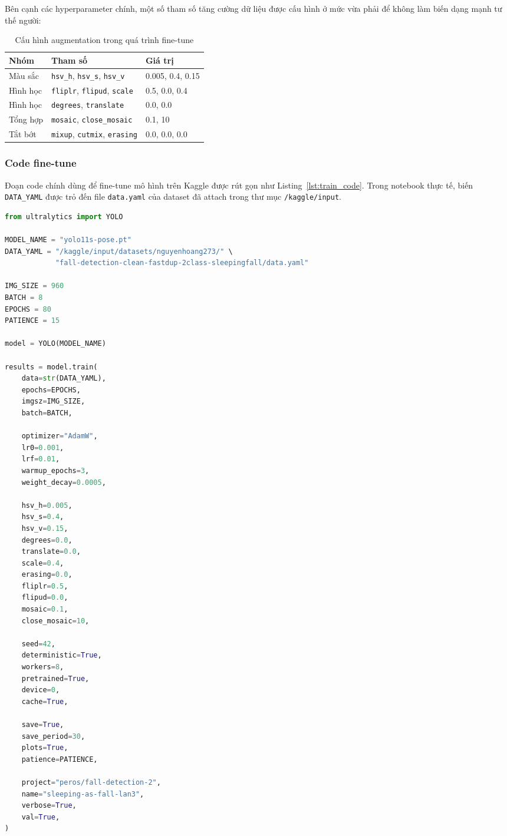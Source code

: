 \documentclass[12pt, a4paper]{article}
\begin{document}
Bên cạnh các hyperparameter chính, một số tham số tăng cường dữ liệu được cấu hình ở mức vừa phải để không làm biến dạng mạnh tư thế người:

\begin{table}[H]
  \centering
  \caption{Cấu hình augmentation trong quá trình fine-tune}
  \label{tab:augmentation_params}
  \begin{tabular}{@{}lll@{}}
    \toprule
    \textbf{Nhóm} & \textbf{Tham số} & \textbf{Giá trị} \\
    \midrule
    Màu sắc & \texttt{hsv\_h}, \texttt{hsv\_s}, \texttt{hsv\_v} & 0.005, 0.4, 0.15 \\
    Hình học & \texttt{fliplr}, \texttt{flipud}, \texttt{scale} & 0.5, 0.0, 0.4 \\
    Hình học & \texttt{degrees}, \texttt{translate} & 0.0, 0.0 \\
    Tổng hợp & \texttt{mosaic}, \texttt{close\_mosaic} & 0.1, 10 \\
    Tắt bớt & \texttt{mixup}, \texttt{cutmix}, \texttt{erasing} & 0.0, 0.0, 0.0 \\
    \bottomrule
  \end{tabular}
\end{table}

\subsubsection{Code fine-tune}
Đoạn code chính dùng để fine-tune mô hình trên Kaggle được rút gọn như Listing~\ref{lst:train_code}.
Trong notebook thực tế, biến \texttt{DATA\_YAML} được trỏ đến file \texttt{data.yaml} của dataset đã attach trong thư mục \texttt{/kaggle/input}.

\begin{lstlisting}[language=Python, caption={Script fine-tune YOLO11s-Pose trên Kaggle}, label={lst:train_code}]
from ultralytics import YOLO

MODEL_NAME = "yolo11s-pose.pt"
DATA_YAML = "/kaggle/input/datasets/nguyenhoang273/" \
            "fall-detection-clean-fastdup-2class-sleepingfall/data.yaml"

IMG_SIZE = 960
BATCH = 8
EPOCHS = 80
PATIENCE = 15

model = YOLO(MODEL_NAME)

results = model.train(
    data=str(DATA_YAML),
    epochs=EPOCHS,
    imgsz=IMG_SIZE,
    batch=BATCH,

    optimizer="AdamW",
    lr0=0.001,
    lrf=0.01,
    warmup_epochs=3,
    weight_decay=0.0005,

    hsv_h=0.005,
    hsv_s=0.4,
    hsv_v=0.15,
    degrees=0.0,
    translate=0.0,
    scale=0.4,
    erasing=0.0,
    fliplr=0.5,
    flipud=0.0,
    mosaic=0.1,
    close_mosaic=10,

    seed=42,
    deterministic=True,
    workers=8,
    pretrained=True,
    device=0,
    cache=True,

    save=True,
    save_period=30,
    plots=True,
    patience=PATIENCE,

    project="peros/fall-detection-2",
    name="sleeping-as-fall-lan3",
    verbose=True,
    val=True,
)
\end{lstlisting}
\end{document}

